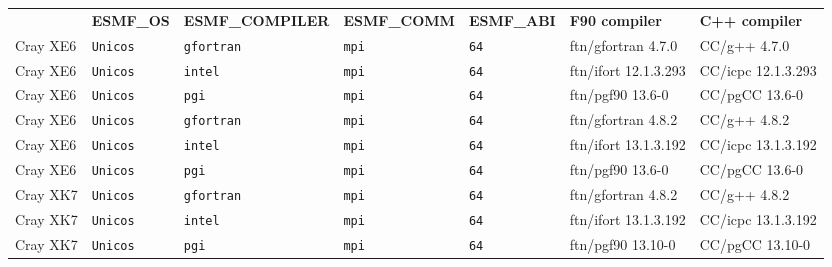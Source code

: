 \begin{longtable}{lllllll}
  &{\bfseries\footnotesize ESMF\_OS} &{\bfseries\footnotesize ESMF\_COMPILER} & {\bfseries\footnotesize ESMF\_COMM} & {\bfseries\footnotesize ESMF\_ABI} &
  {\bfseries\footnotesize F90 compiler} & {\bfseries\footnotesize C++ compiler} \\

Cray XE6              &\tt Unicos &\tt gfortran     &\tt mpi        &\tt 64              & ftn/gfortran \footnotesize 4.7.0   & CC/g++  \footnotesize 4.7.0     \\ %
Cray XE6              &\tt Unicos &\tt intel        &\tt mpi        &\tt 64              & ftn/ifort \footnotesize 12.1.3.293 & CC/icpc \footnotesize 12.1.3.293\\ %
Cray XE6              &\tt Unicos &\tt pgi          &\tt mpi        &\tt 64              & ftn/pgf90 \footnotesize 13.6-0     & CC/pgCC \footnotesize 13.6-0    \\ %
Cray XE6              &\tt Unicos &\tt gfortran     &\tt mpi        &\tt 64              & ftn/gfortran \footnotesize 4.8.2   & CC/g++  \footnotesize 4.8.2     \\ %
Cray XE6              &\tt Unicos &\tt intel        &\tt mpi        &\tt 64              & ftn/ifort \footnotesize 13.1.3.192 & CC/icpc \footnotesize 13.1.3.192\\ %
Cray XE6              &\tt Unicos &\tt pgi          &\tt mpi        &\tt 64              & ftn/pgf90 \footnotesize 13.6-0     & CC/pgCC \footnotesize 13.6-0    \\ %
Cray XK7              &\tt Unicos &\tt gfortran     &\tt mpi        &\tt 64              & ftn/gfortran \footnotesize 4.8.2   & CC/g++ \footnotesize 4.8.2      \\ %
Cray XK7              &\tt Unicos &\tt intel        &\tt mpi        &\tt 64              & ftn/ifort \footnotesize 13.1.3.192 & CC/icpc \footnotesize 13.1.3.192\\ %
Cray XK7              &\tt Unicos &\tt pgi          &\tt mpi        &\tt 64              & ftn/pgf90 \footnotesize 13.10-0    & CC/pgCC \footnotesize 13.10-0   \\ %

\end{longtable}
